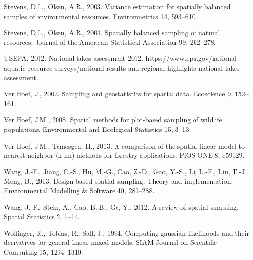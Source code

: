 \documentclass[]{elsarticle} %
\begin{document}
\leavevmode\hypertarget{ref-stevens2003variance}{}%
Stevens, D.L., Olsen, A.R., 2003. Variance estimation for spatially
balanced samples of environmental resources. Environmetrics 14,
593--610.

\leavevmode\hypertarget{ref-stevens2004spatially}{}%
Stevens, D.L., Olsen, A.R., 2004. Spatially balanced sampling of natural
resources. Journal of the American Statistical Association 99, 262--278.

\leavevmode\hypertarget{ref-USEPA2012NLA}{}%
USEPA, 2012. National lakes assessment 2012.
https://www.epa.gov/national-aquatic-resource-surveys/national-results-and-regional-highlights-national-lakes-assessment.

\leavevmode\hypertarget{ref-verhoef2002sampling}{}%
Ver Hoef, J., 2002. Sampling and geostatistics for spatial data.
Ecoscience 9, 152--161.

\leavevmode\hypertarget{ref-verhoef2008spatial}{}%
Ver Hoef, J.M., 2008. Spatial methods for plot-based sampling of
wildlife populations. Environmental and Ecological Statistics 15, 3--13.

\leavevmode\hypertarget{ref-ver2013comparison}{}%
Ver Hoef, J.M., Temesgen, H., 2013. A comparison of the spatial linear
model to nearest neighbor (k-nn) methods for forestry applications. PlOS
ONE 8, e59129.

\leavevmode\hypertarget{ref-wang2013design}{}%
Wang, J.-F., Jiang, C.-S., Hu, M.-G., Cao, Z.-D., Guo, Y.-S., Li, L.-F.,
Liu, T.-J., Meng, B., 2013. Design-based spatial sampling: Theory and
implementation. Environmental Modelling \& Software 40, 280--288.

\leavevmode\hypertarget{ref-wang2012review}{}%
Wang, J.-F., Stein, A., Gao, B.-B., Ge, Y., 2012. A review of spatial
sampling. Spatial Statistics 2, 1--14.

\leavevmode\hypertarget{ref-wolfinger1994computing}{}%
Wolfinger, R., Tobias, R., Sall, J., 1994. Computing gaussian
likelihoods and their derivatives for general linear mixed models. SIAM
Journal on Scientific Computing 15, 1294--1310.
\end{document}
